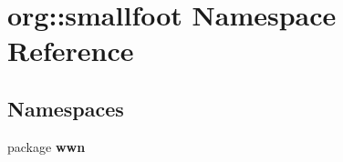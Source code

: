 \section{org\-:\-:smallfoot \-Namespace \-Reference}
\label{namespaceorg_1_1smallfoot}
\subsection*{\-Namespaces}
\begin{DoxyCompactItemize}
\item 
package {\bf wwn}
\end{DoxyCompactItemize}
